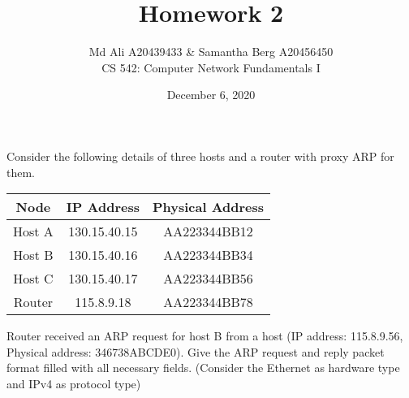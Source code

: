 \documentclass[12pt]{article}
\newenvironment{exercise}[2][Exercise]{\begin{trivlist}
\item[\hskip \labelsep {\bfseries #1}\hskip \labelsep {\bfseries #2.}]}{\end{trivlist}}
\begin{document}
 
\title{Homework 2}
\author{Md Ali A20439433 \& Samantha Berg A20456450\\ 
CS 542: Computer Network Fundamentals I} 
\date{December 6, 2020}

\maketitle
 
\begin{exercise}{1}
Consider the following details of three hosts and a router with proxy ARP for them. 
\begin{center}
\begin{tabular}{|c|c|c|}
    \hline
   \textbf{Node} & \textbf{IP Address} & \textbf{Physical Address} \\
   \hline 
    Host A & 130.15.40.15 & AA223344BB12 \\ 
    \hline 
    Host B & 130.15.40.16 & AA223344BB34 \\ 
    \hline 
    Host C & 130.15.40.17 & AA223344BB56 \\ 
    \hline 
    Router & 115.8.9.18 & AA223344BB78 \\
    \hline
\end{tabular}
\end{center}
Router received an ARP request for host B from a host (IP address: 115.8.9.56, Physical
address: 346738ABCDE0). Give the ARP request and reply packet format filled with all
necessary fields. (Consider the Ethernet as hardware type and IPv4 as protocol type)
\end{exercise} 
\end{document}

